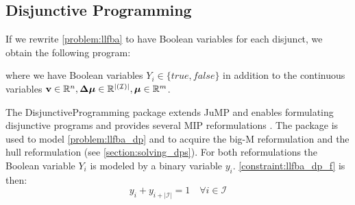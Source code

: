 \subsection{Disjunctive Programming} \label{section:disjunctive_programming}
If we rewrite \cref{problem:llfba} to have Boolean variables for each disjunct, we obtain the following program:
\quad where we have Boolean variables $Y_i \in \{true, false \}$ in addition to the continuous variables $\bold v \in \mathbb{R}^n, \boldsymbol{\Delta \mu} \in \mathbb{R}^{| (\mathcal{I})|}, \boldsymbol \mu \in \mathbb{R}^m$. %

The \textsf{DisjunctiveProgramming} package extends \textsf{JuMP} and enables formulating disjunctive programs and provides several MIP reformulations \cite{perez_disjunctiveprogrammingjl_2023}
. The package is used to model \cref{problem:llfba_dp} and to acquire the big-M reformulation and the hull reformulation (see \cref{section:solving_dps}). For both reformulations the Boolean variable $Y_i$ is modeled by a binary variable $y_i$. \cref{constraint:llfba_dp_f} is then:
\begin{equation*}
    y_i + y_{i + |\mathcal{I}|} = 1 \quad \forall i \in \mathcal{I}
\end{equation*}

